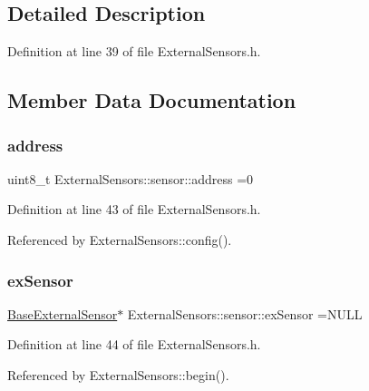 \subsection{Detailed Description}


Definition at line 39 of file External\+Sensors.\+h.



\subsection{Member Data Documentation}
\mbox{\label{structExternalSensors_1_1sensor_a8d70ca58524521ed054fc6b81eb58d34}} 
\subsubsection{\texorpdfstring{address}{address}}
{\footnotesize\ttfamily uint8\+\_\+t External\+Sensors\+::sensor\+::address =0}



Definition at line 43 of file External\+Sensors.\+h.



Referenced by External\+Sensors\+::config().

\mbox{\label{structExternalSensors_1_1sensor_a9bca150fd468b8d0e090e6d72c5c2b48}} 
\subsubsection{\texorpdfstring{ex\+Sensor}{exSensor}}
{\footnotesize\ttfamily \hyperlink{classBaseExternalSensor}{Base\+External\+Sensor}$\ast$ External\+Sensors\+::sensor\+::ex\+Sensor =N\+U\+LL}



Definition at line 44 of file External\+Sensors.\+h.



Referenced by External\+Sensors\+::begin().

\mbox{\label{structExternalSensors_1_1sensor_afed5bdfd49732202a368b600cb8396fe}} 
